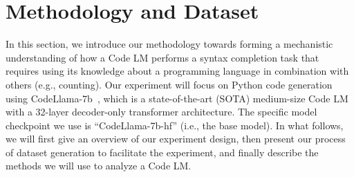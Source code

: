 \section{Methodology and Dataset}\label{sec:dataset-and-methodology}

In this section, we introduce our methodology towards forming a mechanistic understanding of how a Code LM performs a syntax completion task that requires using its knowledge about a programming language in combination with others (e.g., counting). Our experiment will focus on Python code generation using CodeLlama-7b~\cite{roziere2023code}, which is a state-of-the-art (SOTA) medium-size Code LM with a 32-layer decoder-only transformer architecture. The specific model checkpoint we use is ``CodeLlama-7b-hf'' (i.e., the base model). In what follows, we will first give an overview of our experiment design, then present our process of dataset generation to facilitate the experiment, and finally describe the methods we will use to analyze a Code LM.

